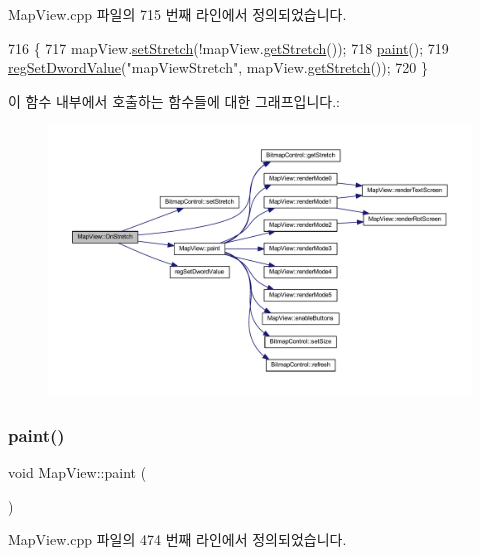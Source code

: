Map\+View.\+cpp 파일의 715 번째 라인에서 정의되었습니다.


\begin{DoxyCode}
716 \{
717   mapView.\mbox{\hyperlink{class_bitmap_control_ab545e15ea3edda9f0d80c0b8b0b7c812}{setStretch}}(!mapView.\mbox{\hyperlink{class_bitmap_control_a1d3cff9a3b57dd7558d678177dcf4b5c}{getStretch}}());
718   \mbox{\hyperlink{class_map_view_a89edf3053cffa4a68516178dbd987339}{paint}}();
719   \mbox{\hyperlink{_reg_8cpp_a758e775489a3fb5c3cc7071fdd5af87e}{regSetDwordValue}}(\textcolor{stringliteral}{"mapViewStretch"}, mapView.\mbox{\hyperlink{class_bitmap_control_a1d3cff9a3b57dd7558d678177dcf4b5c}{getStretch}}());  
720 \}
\end{DoxyCode}
이 함수 내부에서 호출하는 함수들에 대한 그래프입니다.\+:
\nopagebreak
\begin{figure}[H]
\begin{center}
\leavevmode
\includegraphics[width=350pt]{class_map_view_a835d1f2f38753ace4840b69e4eaafcaf_cgraph}
\end{center}
\end{figure}
\mbox{\label{class_map_view_a89edf3053cffa4a68516178dbd987339}} 
\subsubsection{\texorpdfstring{paint()}{paint()}}
{\footnotesize\ttfamily void Map\+View\+::paint (\begin{DoxyParamCaption}{ }\end{DoxyParamCaption})}



Map\+View.\+cpp 파일의 474 번째 라인에서 정의되었습니다.


